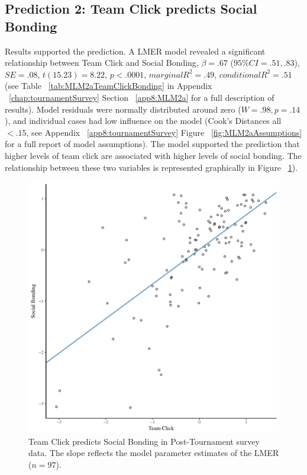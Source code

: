 \begin{CJK}{UTF8}{gbsn}
\subsection{Prediction 2: Team Click predicts Social Bonding}


 Results supported the prediction.  A LMER model revealed a significant relationship between Team Click and Social Bonding, $\beta = .67$ ($95\% CI =  .51, .83$), $SE = .08$, $t(15.23) = 8.22$, $p < .0001$, $marginal R^2 = .49$, $conditional R^2 = .51$ (see Table ~\ref{tab:MLM2aTeamClickBonding} in Appendix ~\ref{chap:tournamentSurvey} Section ~\ref{app8:MLM2a} for a full description of results).  Model residuals were normally distributed around zero ($W = .98, p = .14$), and individual cases had low influence on the model (Cook's Distances all $< .15$, see Appendix ~\ref{app8:tournamentSurvey} Figure ~\ref{fig:MLM2aAssumptions} for a full report of model assumptions).  The model supported the prediction that higher levels of team click are associated with higher levels of social bonding.  The relationship between these two variables is represented graphically in Figure ~\ref{fig:clickBondModelSlope}).

  \begin{figure}[htbp]
    \centering
  \includegraphics[scale=.5]{images/clickBondModelSlope.pdf}
    \caption{Team Click predicts Social Bonding in Post-Tournament survey data. The slope reflects the model parameter estimates of the LMER ($n = 97$).}
    \label{fig:clickBondModelSlope}
  \end{figure}




\end{CJK}
